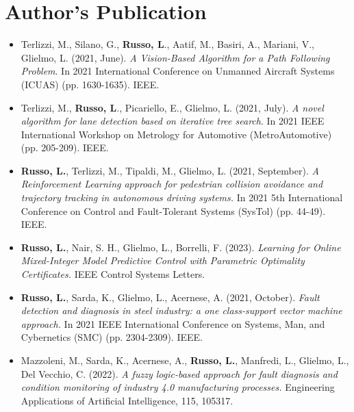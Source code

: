 \section{Author's Publication}
\begin{itemize}
    \item \cite{terlizzi2021vision} Terlizzi, M., Silano, G.,\textbf{ Russo, L}., Aatif, M., Basiri, A., Mariani, V.,  Glielmo, L. (2021, June). \textit{A Vision-Based Algorithm for a Path Following Problem}. In 2021 International Conference on Unmanned Aircraft Systems (ICUAS) (pp. 1630-1635). IEEE.
    \item \cite{terlizzi2021novel} Terlizzi, M.,\textbf{ Russo, L}., Picariello, E.,  Glielmo, L. (2021, July).\textit{ A novel algorithm for lane detection based on iterative tree search}. In 2021 IEEE International Workshop on Metrology for Automotive (MetroAutomotive) (pp. 205-209). IEEE.
    \item \cite{russo2021reinforcement} \textbf{Russo, L.}, Terlizzi, M., Tipaldi, M.,  Glielmo, L. (2021, September). \textit{A Reinforcement Learning approach for pedestrian collision avoidance and trajectory tracking in autonomous driving systems.} In 2021 5th International Conference on Control and Fault-Tolerant Systems (SysTol) (pp. 44-49). IEEE.
    \item \cite{russo2023learning}\textbf{ Russo, L.}, Nair, S. H., Glielmo, L.,  Borrelli, F. (2023). \textit{Learning for Online Mixed-Integer Model Predictive Control with Parametric Optimality Certificates.} IEEE Control Systems Letters.
    \item \cite{russo2021fault} \textbf{Russo, L.}, Sarda, K., Glielmo, L.,  Acernese, A. (2021, October). \textit{Fault detection and diagnosis in steel industry: a one class-support vector machine approach.} In 2021 IEEE International Conference on Systems, Man, and Cybernetics (SMC) (pp. 2304-2309). IEEE.
    \item \cite{mazzoleni2022fuzzy} Mazzoleni, M., Sarda, K., Acernese, A., \textbf{Russo, L.}, Manfredi, L., Glielmo, L.,  Del Vecchio, C. (2022). \textit{A fuzzy logic-based approach for fault diagnosis and condition monitoring of industry 4.0 manufacturing processes.} Engineering Applications of Artificial Intelligence, 115, 105317.
\end{itemize}


 
  
